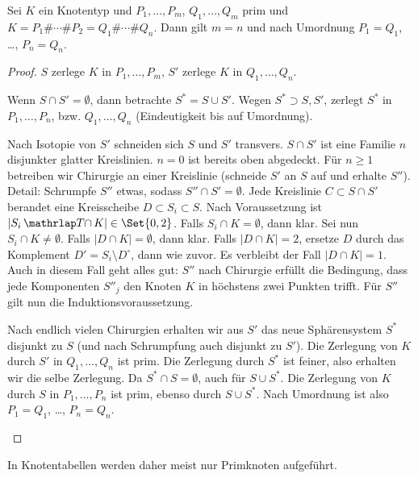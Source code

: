 \begin{st}
    Sei $K$ ein Knotentyp und $P_1, \dotsc, P_m$, $Q_1, \dotsc, Q_m$ prim und
    \begin{math}
        K = P_1 \# \dotsb \# P_2 = Q_1 \# \dotsb \# Q_n.
    \end{math}
    Dann gilt $m = n$ und nach Umordnung $P_1 = Q_1$, \dots, $P_n = Q_n$.
    \begin{proof}
        $S$ zerlege $K$ in $P_1, \dotsc, P_m$, $S'$ zerlege $K$ in $Q_1, \dotsc, Q_n$.
        \begin{seg}[$S \cap S' = \emptyset$]
            Wenn $S \cap S' = \emptyset$, dann betrachte $S^* = S \cup S'$.
            Wegen $S^* \supset S, S'$, zerlegt $S^*$ in $P_1, \dotsc, P_n$, bzw. $Q_1, \dotsc, Q_n$ (Eindeutigkeit bis auf Umordnung).
        \end{seg}
        \begin{seg}
            Nach Isotopie von $S'$ schneiden sich $S$ und $S'$ transvers.
            $S \cap S'$ ist eine Familie $n$ disjunkter glatter Kreislinien.
            $n = 0$ ist bereits oben abgedeckt.
            Für $n \ge 1$ betreiben wir Chirurgie an einer Kreislinie (schneide $S'$ an $S$ auf und erhalte $S''$).
            Detail: Schrumpfe $S''$ etwas, sodass $S'' \cap S' = \emptyset$.
            Jede Kreislinie $C \subset S \cap S'$ berandet eine Kreisscheibe $D \subset S_i \subset S$.
            Nach Voraussetzung ist $|S_i \Tcap K| \in \Set{0,2}$.
            Falls $S_i \cap K = \emptyset$, dann klar.
            Sei nun $S_i \cap K \neq \emptyset$.
            Falls $|D \cap K| = \emptyset$, dann klar.
            Falls $|D \cap K| = 2$, ersetze $D$ durch das Komplement $D' = S_i \setminus D^\circ$, dann wie zuvor.
            Es verbleibt der Fall $|D \cap K| = 1$.
            Auch in diesem Fall geht alles gut:
            $S''$ nach Chirurgie erfüllt die Bedingung, dass jede Komponenten $S''_j$ den Knoten $K$ in höchstens zwei Punkten trifft.
            Für $S''$ gilt nun die Induktionsvoraussetzung.

            Nach endlich vielen Chirurgien erhalten wir aus $S'$ das neue Sphärensystem $S^*$ disjunkt zu $S$ (und nach Schrumpfung auch disjunkt zu $S'$).
            Die Zerlegung von $K$ durch $S'$ in $Q_1, \dotsc, Q_n$ ist prim.
            Die Zerlegung durch $S^*$ ist feiner, also erhalten wir die selbe Zerlegung.
            Da $S^* \cap S = \emptyset$, auch für $S \cup S^*$.
            Die Zerlegung von $K$ durch $S$ in $P_1, \dotsc, P_n$ ist prim, ebenso durch $S \cup S^*$.
            Nach Umordnung ist also $P_1 = Q_1$, \dots, $P_n = Q_n$.
        \end{seg}
    \end{proof}
    \begin{note}
        In Knotentabellen werden daher meist nur Primknoten aufgeführt.
    \end{note}
\end{st}


